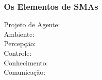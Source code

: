 \begin{frame}[allowframebreaks=0.9]

    \frametitle{Os Elementos de SMAs}
   
   \begin{description}
     \item[Projeto de Agente:] 
     
    \item[Ambiente:]
          
   \item[Percepção:]
               
 \item[Controle:]
                    
  \item[Conhecimento:]
                          
  \item[Comunicação:]
          
   \end{description}
   
   
\end{frame}


